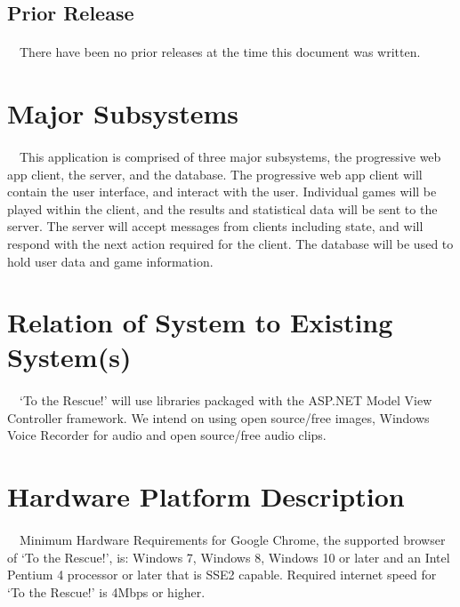 \documentclass[12pt]{report}
\begin{document}
		\subsection{Prior Release}
			\paragraph{}\ \ There have been no prior releases at the time this document was written.
	\section{Major Subsystems}
		\paragraph{}\ \ This application is comprised of three major subsystems, the progressive web app client, the server, and the database. The progressive web app client will contain the user interface, and interact with the user. Individual games will be played within the client, and the results and statistical data will be sent to the server. The server will accept messages from clients including state, and will respond with the next action required for the client. The database will be used to hold user data and game information.
			
	\section{Relation of System to Existing System(s)}
		\paragraph{}\ \ ‘To the Rescue!’ will use libraries packaged with the ASP.NET Model View Controller framework. We intend on using open source/free images, Windows Voice Recorder for audio and open source/free audio clips.
	\section{Hardware Platform Description}
		\paragraph{}\ \ Minimum Hardware Requirements for Google Chrome, the supported browser of ‘To the Rescue!’, is: Windows 7, Windows 8, Windows 10 or later and an Intel Pentium 4 processor or later that is SSE2 capable. Required internet speed for ‘To the Rescue!’ is 4Mbps or higher.
\end{document}
